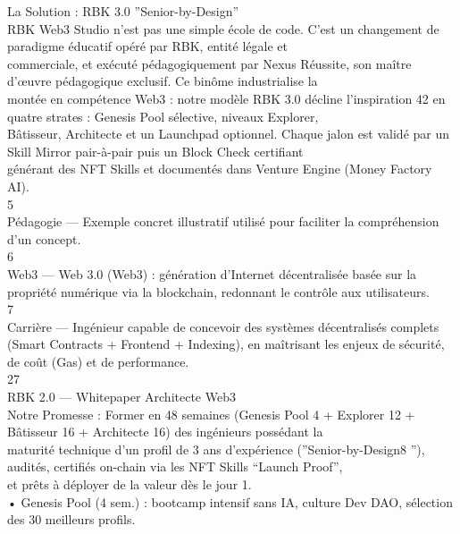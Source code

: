\documentclass[12pt,landscape,a4paper]{article}
\begin{document}
La Solution : RBK 3.0 ”Senior-by-Design”\\
RBK Web3 Studio n’est pas une simple école de code. C’est un changement de paradigme éducatif opéré par RBK, entité légale et\\
commerciale, et exécuté pédagogiquement par Nexus Réussite, son maître d’œuvre pédagogique exclusif. Ce binôme industrialise la\\
montée en compétence Web3 : notre modèle RBK 3.0 décline l’inspiration 42 en quatre strates : Genesis Pool sélective, niveaux Explorer,\\
Bâtisseur, Architecte et un Launchpad optionnel. Chaque jalon est validé par un Skill Mirror pair-à-pair puis un Block Check certifiant\\
générant des NFT Skills et documentés dans Venture Engine (Money Factory AI).\\
5\\
Pédagogie — Exemple concret illustratif utilisé pour faciliter la compréhension d’un concept.\\
6\\
Web3 — Web 3.0 (Web3) : génération d’Internet décentralisée basée sur la propriété numérique via la blockchain, redonnant le contrôle aux utilisateurs.\\
7\\
Carrière — Ingénieur capable de concevoir des systèmes décentralisés complets (Smart Contracts + Frontend + Indexing), en maîtrisant les enjeux de sécurité,\\
de coût (Gas) et de performance.\\
\vspace{0.5em}
\vspace{0.5em}
\vspace{0.5em}
27\\
RBK 2.0 — Whitepaper Architecte Web3\\
\vspace{0.5em}
\vspace{0.5em}
Notre Promesse : Former en 48 semaines (Genesis Pool 4 + Explorer 12 + Bâtisseur 16 + Architecte 16) des ingénieurs possédant la\\
maturité technique d’un profil de 3 ans d’expérience (”Senior-by-Design8 ”), audités, certifiés on-chain via les NFT Skills “Launch Proof”,\\
et prêts à déployer de la valeur dès le jour 1.\\
\vspace{0.5em}
• Genesis Pool (4 sem.) : bootcamp intensif sans IA, culture Dev DAO, sélection des 30 meilleurs profils.\\
\end{document}
